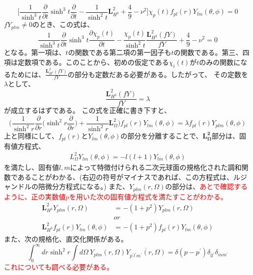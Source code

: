  \begin{equation}
   \biggl[\frac{1}{\sinh^3t}\frac{\partial}{\partial t}\sinh^3t\frac{\partial}{\partial t}-\frac{1}{\sinh^2t}\bm{L}^2_{H^3}+\frac{4}{9}-\nu^2\biggr]\chi_p(t)f_{pl}(r)Y_{lm}(\theta,\phi)=0
 \end{equation}
 $fY_{plm}\neq0$のとき、この式は、
 \begin{equation}
   \label{fieom}
    \frac{1}{\sinh^3t}\frac{\partial}{\partial t}\sinh^3t\frac{\partial\chi_p(t)}{\partial t}-\frac{\chi_p(t)}{\sinh^2t}\frac{\bm{L}^2_{H^3}(fY)}{fY}+\frac{4}{9}-\nu^2=0
 \end{equation}
 となる。第一項は、$t$の関数である第二項の第一因子も$t$の関数である。第三、四項は定数項である。このことから、初めの仮定である$\chi_i(t)$が$t$のみの関数になるためには、$\frac{\bm{L}^2_{H^3}(fY)}{fY}$の部分も定数だある必要がある。したがって、
 その定数を$\lambda$として、
 \begin{equation}
   \frac{\bm{L}^2_{H^3}(fY)}{fY}=\lambda
 \end{equation}
 が成立するはずである。
 この式を正確に書き下すと、
 \begin{equation}
   \biggl(\frac{1}{\sinh^2r}\frac{\partial}{\partial r}\biggl(\sinh^2r\frac{\partial}{\partial r}\biggr)+\frac{1}{\sinh^2r}\bm{L}_{\Omega}^2\biggr)f_{pl}(r)Y_{lm}(\theta,\phi)=\lambda f_{pl}(r)Y_{plm}(\theta,\phi)
 \end{equation}
 上と同様にして、$f_{pl}(r)$と$Y_{lm}(\theta,\phi)$の部分を分離することで、$\bm{L_{\Omega}^2}$部分は、固有値方程式、
\begin{align}
  L_{\Omega}^2Y_{lm}(\theta,\phi)=-l(l+1)Y_{lm}(\theta,\phi)
\end{align}
を満たし、固有値$l,m$によって特徴付けられる二次元球面の規格化された調和関数であることがわかる、(右辺の符号がマイナスであれば、この方程式は、ルジャンドルの陪微分方程式になる。)
また、$Y_{plm}(r,\Omega)$の部分は、\textcolor{red}{あとで確認するように、正の実数値$p$を用いた次の固有値方程式を満たすことがわかる。}
\begin{align}
  \label{Yplm}
  \bm{L}_{H^3}^2Y_{plm}(r,\Omega)&=-(1+p^2)Y_{plm}(r,\Omega) \\
  &or \\
 \bm{L}_{H^3}^2f_{pl}(r)Y_{lm}(\theta,\phi)&=-(1+p^2)f_{pl}(r)Y_{lm}(\theta,\phi)
\end{align}
また、次の規格化、直交化関係がある。
\begin{equation}
  \label{Ynor}
  \int_0^{\infty} dr \sinh^2r \int d\Omega \ Y_{plm}(r,\Omega)\overline{Y_{p^{\prime}l^{\prime}m^{\prime}}(r ,\Omega)}=\delta(p-p^{\prime})\delta_{ll^{\prime}}\delta_{mm^{\prime}}
\end{equation}
\textcolor{red}{これについても調べる必要がある。}

